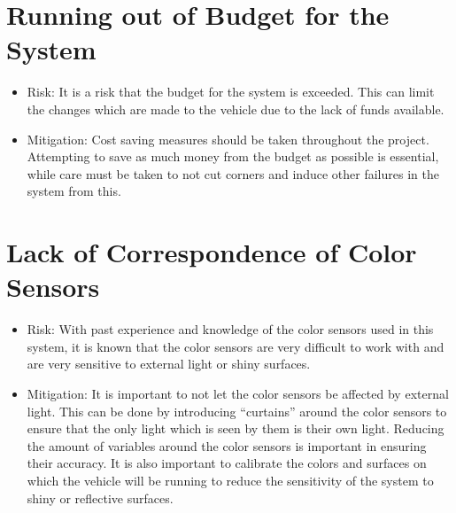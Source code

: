 \documentclass[11pt]{report}
\begin{document}
\section{Running out of Budget for the System}
\begin{itemize}
    \item Risk: It is a risk that the budget for the system is exceeded. This can limit the changes which are made to the vehicle due to the lack of funds available. 
    \item Mitigation: Cost saving measures should be taken throughout the project. Attempting to save as much money from the budget as possible is essential, while care must be taken to not cut corners and induce other failures in the system from this. 
\end{itemize}
\section{Lack of Correspondence of Color Sensors}
\begin{itemize}
    \item Risk: With past experience and knowledge of the color sensors used in this system, it is known that the color sensors are very difficult to work with and are very sensitive to external light or shiny surfaces.
    \item Mitigation: It is important to not let the color sensors be affected by external light. This can be done by introducing ``curtains'' around the color sensors to ensure that the only light which is seen by them is their own light. Reducing the amount of variables around the color sensors is important in ensuring their accuracy. It is also important to calibrate the colors and surfaces on which the vehicle will be running to reduce the sensitivity of the system to shiny or reflective surfaces. 
\end{itemize}
\end{document}
